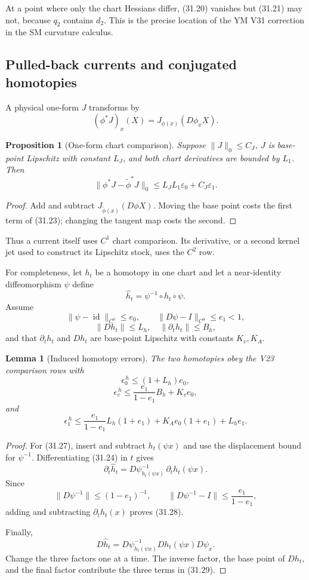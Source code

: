 \documentclass[11pt]{article}
\newtheorem{lemma}[theorem]{Lemma}
\newtheorem{proposition}[theorem]{Proposition}
\begin{document}
At a point where only the chart Hessians differ, (31.20) vanishes but
(31.21) may not, because \(q_2\) contains \(d_2\).  This is the precise
location of the YM V31 correction in the SM curvature calculus.

\subsection{Pulled-back currents and conjugated homotopies}

A physical one-form \(J\) transforms by
\[
 (\phi^*J)_x(X)=J_{\phi(x)}(D\phi_xX).
 \tag{31.22}
\]

\begin{proposition}[One-form chart comparison]
\label{prop:v11v31-oneform}
Suppose \(\|J\|_0\leq C_J\), \(J\) is base-point Lipschitz with constant
\(L_J\), and both chart derivatives are bounded by \(L_1\).  Then
\[
 \|\phi^*J-\widetilde\phi^*J\|_0
 \leq
 L_JL_1\varepsilon_0+C_J\varepsilon_1.
 \tag{31.23}
\]
\end{proposition}

\begin{proof}
Add and subtract
\(J_{\widetilde\phi(x)}(D\phi X)\).  Moving the base point costs the
first term of (31.23); changing the tangent map costs the second.
\end{proof}

Thus a current itself uses \(C^1\) chart comparison.  Its derivative, or
a second kernel jet used to construct its Lipschitz stock, uses the
\(C^2\) row.

For completeness, let \(h_t\) be a homotopy in one chart and let a
near-identity diffeomorphism \(\psi\) define
\[
 \widehat h_t=\psi^{-1}\circ h_t\circ\psi.
 \tag{31.24}
\]
Assume
\[
 \|\psi-\operatorname{id}\|_{C^0}\leq e_0,\qquad
 \|D\psi-I\|_{C^0}\leq e_1<1,
 \tag{31.25}
\]
\[
 \|Dh_t\|\leq L_h,\quad \|\partial_th_t\|\leq B_h,
 \tag{31.26}
\]
and that \(\partial_th_t\) and \(Dh_t\) are base-point Lipschitz with
constants \(K_v,K_A\).

\begin{lemma}[Induced homotopy errors]
\label{lem:v11v31-homotopy-errors}
The two homotopies obey the V23 comparison rows with
\[
 \epsilon_0^{\,h}\leq(1+L_h)e_0,
 \tag{31.27}
\]
\[
 \epsilon_v^{\,h}
 \leq
 \frac{e_1}{1-e_1}B_h+K_ve_0,
 \tag{31.28}
\]
and
\[
 \epsilon_1^{\,h}
 \leq
 \frac{e_1}{1-e_1}L_h(1+e_1)
 +K_Ae_0(1+e_1)+L_he_1.
 \tag{31.29}
\]
\end{lemma}

\begin{proof}
For (31.27), insert and subtract \(h_t(\psi x)\) and use the displacement
bound for \(\psi^{-1}\).  Differentiating (31.24) in \(t\) gives
\[
 \partial_t\widehat h_t
 =
 D\psi^{-1}_{h_t(\psi x)}\,\partial_th_t(\psi x).
\]
Since
\[
 \|D\psi^{-1}\|\leq(1-e_1)^{-1},\qquad
 \|D\psi^{-1}-I\|\leq\frac{e_1}{1-e_1},
\]
adding and subtracting \(\partial_th_t(x)\) proves (31.28).

Finally,
\[
 D\widehat h_t
 =
 D\psi^{-1}_{h_t(\psi x)}
 Dh_t(\psi x)D\psi_x.
\]
Change the three factors one at a time.  The inverse factor, the base
point of \(Dh_t\), and the final factor contribute the three terms in
(31.29).
\end{proof}
\end{document}
